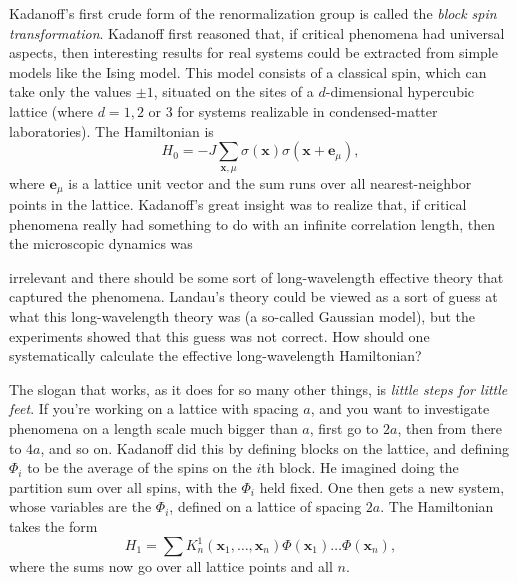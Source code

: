 Kadanoff's first crude form of the renormalization group is called the
\emph{block spin transformation}. Kadanoff first reasoned that, if critical
phenomena had universal aspects, then interesting results for real systems
could be extracted from simple models like the Ising model. This model
consists of a classical spin, which can take only the values $\pm1$, situated
on the sites of a $d$-dimensional hypercubic lattice (where $d=1,2$ or 3 for
systems realizable in condensed-matter laboratories). The Hamiltonian is
\[
  H_0=-J\sum_{\mathbf x,\mu}\sigma(\mathbf x)\sigma(\mathbf x+\mathbf e_\mu),
\]
where $\mathbf e_\mu$ is a lattice unit vector and the sum runs over all
nearest-neighbor points in the lattice.
Kadanoff's great insight was to realize that, if critical phenomena really had
something to do with an infinite correlation length, then the microscopic
dynamics was

irrelevant and there should be some sort of long-wavelength effective theory
that captured the phenomena. Landau's theory could be viewed as a sort of
guess at what this long-wavelength theory was (a so-called Gaussian model), but
the experiments showed that this guess was not correct. How should one
systematically calculate the effective long-wavelength Hamiltonian?

The slogan that works, as it does for so many other things, is \emph{little
steps for little feet}. If you're working on a lattice with spacing $a$, and
you want to investigate phenomena on a length scale much bigger than $a$,
first go to $2a$, then from there to $4a$, and so on. Kadanoff did this by
defining blocks on the lattice, and defining $\Phi_i$ to be the average of the
spins on the $i$th block. He imagined doing the partition sum over all spins,
with the $\Phi_i$ held fixed. One then gets a new system, whose variables are
the $\Phi_i$, defined on a lattice of spacing $2a$. The Hamiltonian takes the
form
\[
  H_1=\sum K_n^1(\mathbf x_1,\ldots,\mathbf x_n)
  \Phi(\mathbf x_1)\ldots\Phi(\mathbf x_n),
\]
where the sums now go over all lattice points and all $n$.


